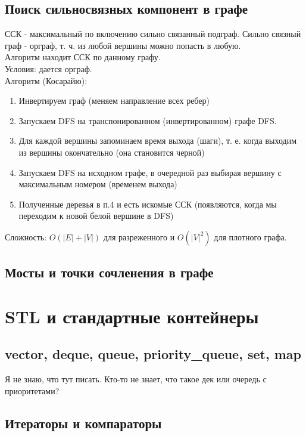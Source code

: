 \documentclass[a4paper]{article}
\begin{document}
\subsection{Поиск сильносвязных компонент в графе}
ССК - максимальный по включению сильно связанный подграф. Сильно связный граф - орграф, т. ч. из любой вершины можно попасть в любую.\\
Алгоритм находит ССК по данному графу.\\
Условия: дается орграф.\\
Алгоритм (Косарайю):
\begin{enumerate}
	\item Инвертируем граф (меняем направление всех ребер)
	\item Запускаем DFS на транспонированном (инвертированном) графе DFS.
	\item Для каждой вершины запоминаем время выхода (шаги), т. е. когда выходим из вершины окончательно (она становится черной)
	\item Запускаем DFS на исходном графе, в очередной раз выбирая вершину с максимальным номером (временем выхода)
	\item Полученные деревья в п.4 и есть искомые ССК (появляются, когда мы переходим к новой белой вершине в DFS)
\end{enumerate}
Сложность: $O(|E| + |V|)$ для разреженного и $O(|V|^2)$ для плотного графа. 
\subsection{Мосты и точки сочленения в графе}

\section{STL и стандартные контейнеры}
\subsection{vector, deque, queue, priority\_queue, set, map}
Я не знаю, что тут писать. Кто-то не знает, что такое дек или очередь с приоритетами?
\subsection{Итераторы и компараторы}
\end{document}
